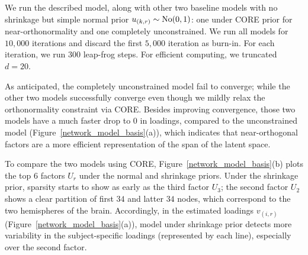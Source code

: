 \documentclass[10pt,fleqn]{article}
\DeclareMathOperator{\1}{\mathbbm{1}} \DeclareMathOperator{\bigO}{\mc O}
\begin{document}
We run the described model, along with other two 
baseline models with no shrinkage but simple normal prior $u_{(k,r)}\sim\operatorname{No}(0,1)$:
one under CORE prior for near-orthonormality 
and one completely unconstrained. We run all
models for $10,000$ iterations and discard the first $5,000$ iteration as
burn-in.  For each iteration, we run $300$ leap-frog steps. For efficient
computing, we truncated $d=20$.

As anticipated, the completely unconstrained model fail to converge; while the other two
models successfully converge even though we mildly relax the orthonormality
constraint via CORE. Besides improving convergence,
those two models have a much faster drop to $0$ in loadings, compared to the unconstrained
model (Figure~\ref{network_model_basis}(a)), which 
indicates that near-orthogonal factors are a more efficient representation of
the span  of the latent space.

To compare the two models using CORE, Figure~\ref{network_model_basis}(b) plots
the top $6$ factors $U_r$ under the normal and shrinkage priors. Under the
shrinkage prior, sparsity starts to show as early as the third factor $U_3$; the
second factor $U_2$ shows a clear partition of first $34$ and latter $34$ nodes,
which correspond to the two hemispheres of the brain. Accordingly, in the
estimated loadings $v_{(i,r) }$ (Figure~\ref{network_model_basis}(a)), model
under shrinkage prior detects more variability in the subject-specific loadings
(represented by each line), especially over the second factor.
\end{document}
